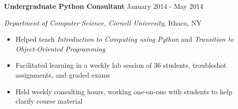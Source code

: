 

\vspace{5pt}

\textbf{Undergraduate Python Consultant} \hfill January 2014 - May 2014

\textit{Department of Computer Science, Cornell University}, Ithaca, NY

\begin{itemize}
    \item Helped teach \textit{Introduction to Computing using Python} and \textit{Transition to Object-Oriented Programming}
    \item Facilitated learning in a weekly lab session of 36 students, troubleshot assignments, and graded exams
    \item Held weekly consulting hours, working one-on-one with students to help clarify course material
\end{itemize}
